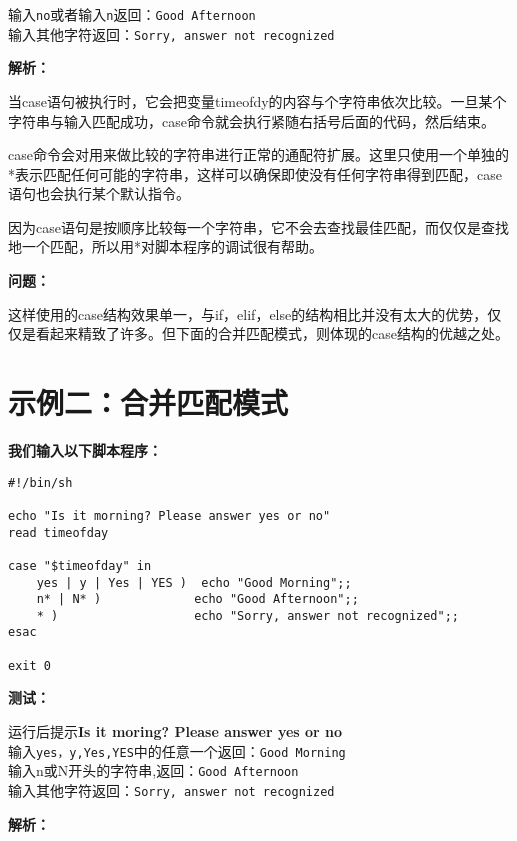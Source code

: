 \documentclass{ctexart}
\begin{document}
\begin{sloppypar}
输入\verb|no|或者输入\verb|n|返回：\verb|Good Afternoon|\\

输入其他字符返回：\verb|Sorry, answer not recognized|

{\bfseries 解析：}

当case语句被执行时，它会把变量timeofdy的内容与个字符串依次比较。一旦某个字符串与输入匹配成功，case命令就会执行紧随右括号后面的代码，然后结束。

case命令会对用来做比较的字符串进行正常的通配符扩展。这里只使用一个单独的*表示匹配任何可能的字符串，这样可以确保即使没有任何字符串得到匹配，case语句也会执行某个默认指令。

因为case语句是按顺序比较每一个字符串，它不会去查找最佳匹配，而仅仅是查找地一个匹配，所以用*对脚本程序的调试很有帮助。

{\bfseries 问题：}

这样使用的case结构效果单一，与if，elif，else的结构相比并没有太大的优势，仅仅是看起来精致了许多。但下面的合并匹配模式，则体现的case结构的优越之处。


\section{示例二：合并匹配模式}

{\bfseries 我们输入以下脚本程序：}

\begin{verbatim}
#!/bin/sh

echo "Is it morning? Please answer yes or no"
read timeofday

case "$timeofday" in
    yes | y | Yes | YES )  echo "Good Morning";;
    n* | N* )             echo "Good Afternoon";;
    * )                   echo "Sorry, answer not recognized";; 
esac

exit 0

\end{verbatim}

{\bfseries 测试：}

运行后提示{\bfseries Is it moring? Please answer yes or no}\\

输入\verb|yes，y,Yes,YES|中的任意一个返回：\verb|Good Morning|\\

输入n或N开头的字符串,返回：\verb|Good Afternoon|\\

输入其他字符返回：\verb|Sorry, answer not recognized|

{\bfseries 解析：}


\end{sloppypar}
\end{document}
